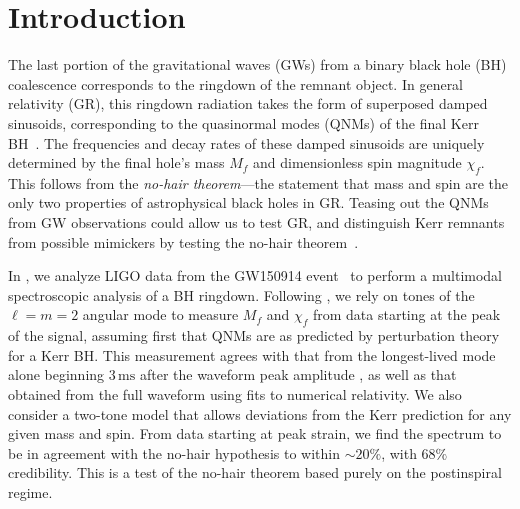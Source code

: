 \documentclass[letterpaper]{article}
\newcommand{\mf}{M_f}
\newcommand{\chif}{\chi_f}
\begin{document}
\section{Introduction}
\label{sec:intro}

The last portion of the gravitational waves (GWs) from a binary black hole (BH) coalescence corresponds to the ringdown of the remnant object.
In general relativity (GR), this ringdown radiation takes the form of superposed damped sinusoids, corresponding to the quasinormal modes (QNMs) of the final Kerr BH~\cite{Vishveshwara1970b,Press1971,Teukolsky,ChandraDetweiler1975}.
The frequencies and decay rates of these damped sinusoids are uniquely determined by the final hole's mass $\mf$ and dimensionless spin magnitude $\chif$.
This follows from the \emph{no-hair theorem}---the statement that mass and spin are the only two properties of astrophysical black holes in GR.
Teasing out the QNMs from GW observations could allow us to test GR, and distinguish Kerr remnants from possible mimickers by testing the no-hair theorem~\cite{Echeverria:1989hg,Dreyer:2003bv,Berti:2005ys,Gossan:2011ha,Meidam:2014jpa,Berti:2015itd,Berti:2016lat,Baibhav:2017jhs,Baibhav:2018rfk}.

In \cite{Isi:2019aib}, we analyze LIGO \cite{aLIGO} data from the GW150914 event~\cite{gw150914} to perform a multimodal spectroscopic analysis of a BH ringdown.
Following \cite{Giesler:2019uxc}, we rely on tones of the $\ell=m=2$ angular mode to measure $\mf$ and $\chif$ from data starting at the peak of the signal, assuming first that QNMs are as predicted by perturbation theory for a Kerr BH.
This measurement agrees with that from the longest-lived mode alone beginning $3 \, \mathrm{ms}$ after the waveform peak amplitude \cite{TheLIGOScientific:2016src},
as well as that obtained from the full waveform using fits to numerical relativity.
We also consider a two-tone model that allows deviations from the Kerr prediction for any given mass and spin.
From data starting at peak strain, we find the spectrum to be in agreement with the no-hair hypothesis to within ${\sim}20\%$, with $68\%$ credibility.
This is a test of the no-hair theorem based purely on the postinspiral regime.
\end{document}
